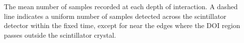 The mean number of samples recorded at each depth of interaction. A dashed line indicates a uniform number of samples detected across the scintillator detector within the fixed time, except for near the edges where the DOI region passes outside the scintillator crystal.
